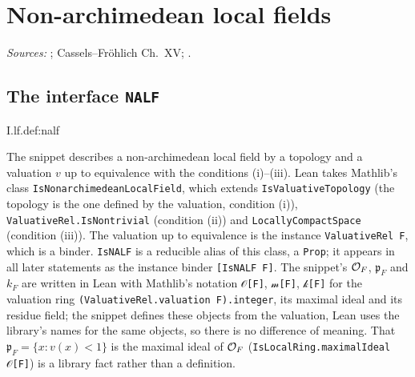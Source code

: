 \chapter{Non-archimedean local fields}\label{ch:ch-0-02-local-field}

\noindent\emph{Sources:} \cite{Corv-ptIII-1}; Cassels--Fr\"ohlich Ch.~XV; \cite[§1]{Cas-p}.

\section{\texorpdfstring{The interface \texttt{NALF}}{The interface NALF}}
\begin{definition}
\end{definition}
\begin{tfformal}{I.lf.def:nalf}
\begin{tffidelity}
The snippet describes a non-archimedean local field by a topology and a valuation $v$ up to equivalence with the conditions (i)--(iii). Lean takes Mathlib's class \texttt{IsNonarchimedeanLocalField}, which extends \texttt{IsValuativeTopology} (the topology is the one defined by the valuation, condition (i)), \texttt{ValuativeRel.IsNontrivial} (condition (ii)) and \texttt{LocallyCompactSpace} (condition (iii)). The valuation up to equivalence is the instance \texttt{ValuativeRel F}, which is a binder. \texttt{IsNALF} is a reducible alias of this class, a \texttt{Prop}; it appears in all later statements as the instance binder \texttt{[IsNALF F]}. The snippet's $\mathcal{O}_F$, $\mathfrak p_F$ and $k_F$ are written in Lean with Mathlib's notation \texttt{𝒪[F]}, \texttt{𝓂[F]}, \texttt{𝓀[F]} for the valuation ring \texttt{(ValuativeRel.valuation F).integer}, its maximal ideal and its residue field; the snippet defines these objects from the valuation, Lean uses the library's names for the same objects, so there is no difference of meaning. That $\mathfrak p_F=\{x:v(x)<1\}$ is the maximal ideal of $\mathcal{O}_F$ (\texttt{IsLocalRing.maximalIdeal 𝒪[F]}) is a library fact rather than a definition.
\end{tffidelity}
\end{tfformal}

